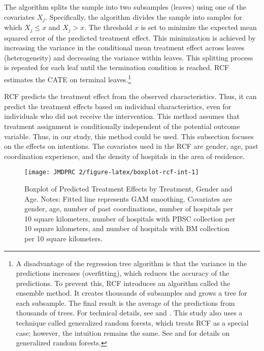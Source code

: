 \documentclass[12pt, a4paper]{article}
\begin{document}
The algorithm splits the sample into two subsamples (leaves) using one of the covariates \(X_j\). Specifically, the algorithm divides the sample into samples for which \(X_j \le x\) and \(X_j > x\). The threshold \(x\) is set to minimize the expected mean squared error of the predicted treatment effect. This minimization is achieved by increasing the variance in the conditional mean treatment effect across leaves (heterogeneity) and decreasing the variance within leaves. This splitting process is repeated for each leaf until the termination condition is reached. RCF estimates the CATE on terminal leaves.\footnote{A disadvantage of the regression tree algorithm is that the variance in the predictions increases (overfitting), which reduces the accuracy of the predictions. To prevent this, RCF introduces an algorithm called the ensemble method. It creates thousands of subsamples and grows a tree for each subsample. The final result is the average of the predictions from thousands of trees. For technical details, see \citet{Athey2016} and \citet{Wager2018}. This study also uses a technique called generalized random forests, which treats RCF as a special case; however, the intuition remains the same. See \citet{Athey2019} and \citet{Athey2019a} for details on generalized random forests.}

RCF predicts the treatment effect from the observed characteristics. Thus, it can predict the treatment effects based on individual characteristics, even for individuals who did not receive the intervention. This method assumes that treatment assignment is conditionally independent of the potential outcome variable. Thus, in our study, this method could be used. This subsection focuses on the effects on intentions. The covariates used in the RCF are gender, age, past coordination experience, and the density of hospitals in the area of residence.

\begin{figure}[t]
\texttt{[image: JMDPRC~2/figure-latex/boxplot-rcf-int-1]} \caption{Boxplot of Predicted Treatment Effects by Treatment, Gender and Age. Notes: Fitted line represents GAM smoothing. Covariates are gender, age, number of past coordinations, number of hospitals per 10 square kilometers, number of hospitals with PBSC collection per 10 square kilometers, and number of hospitals with BM collection per 10 square kilometers.}\label{fig:boxplot-rcf-int}
\end{figure}
\end{document}

